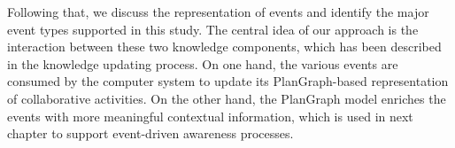 Following that, we discuss the representation of events and identify the major event types supported in this study. The central idea of our approach is the interaction between these two knowledge components, which has been described in the knowledge updating process. On one hand, the various events are consumed by the computer system to update its PlanGraph-based representation of collaborative activities. On the other hand, the PlanGraph model enriches the events with more meaningful contextual information, which is used in next chapter to support event-driven awareness processes. 




 

